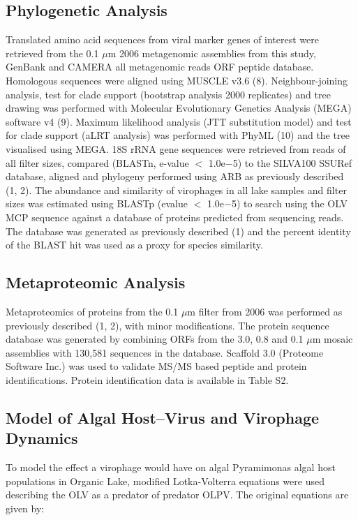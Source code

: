 \subsection{Phylogenetic Analysis}
Translated amino acid sequences from viral marker genes of interest were retrieved from the 0.1 $\mu$m 2006 metagenomic assemblies from this study, GenBank and CAMERA all metagenomic reads ORF peptide database. Homologous sequences were aligned using MUSCLE v3.6 (8). 
Neighbour-joining analysis, test for clade support (bootstrap analysis 2000 replicates) and tree drawing was performed with Molecular Evolutionary Genetics Analysis (MEGA) software v4 (9). 
Maximum likelihood analysis (JTT substitution model) and test for clade support (aLRT analysis) was performed with PhyML (10) and the tree visualised using MEGA. 
18S rRNA gene sequences were retrieved from reads of all filter sizes, compared (BLASTn, e-value $<$ 1.0e$-$5) to the SILVA100 SSURef database, aligned and phylogeny performed using ARB as previously described (1, 2). 
The abundance and similarity of virophages in all lake samples and filter sizes was estimated using BLASTp (evalue $<$ 1.0e$-$5) to search using the OLV MCP sequence against a database of proteins predicted from sequencing reads. 
The database was generated as previously described (1) and the percent identity of the BLAST hit was used as a proxy for species similarity. 

\subsection{Metaproteomic Analysis}
Metaproteomics of proteins from the 0.1 $\mu$m filter from 2006 was performed as previously described (1, 2), with minor modifications. 
The protein sequence database was generated by combining ORFs from the 3.0, 0.8 and 0.1 $\mu$m mosaic assemblies with 130,581 sequences in the database. 
Scaffold 3.0 (Proteome Software Inc.) was used to validate MS/MS based peptide and protein identifications. 
Protein identification data is available in Table S2. 

\subsection[Algal Host--Virus and Virophage Dynamics]{Model of Algal Host--Virus and Virophage Dynamics}
To model the effect a virophage would have on algal Pyramimonas algal host populations in Organic Lake, modified Lotka-Volterra equations were used describing the OLV as a predator of predator OLPV. 
The original equations are given by:

